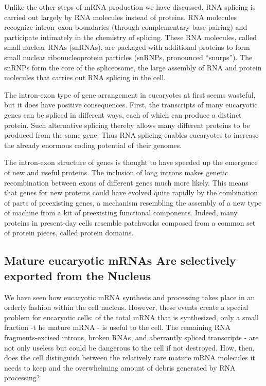 Unlike the other steps of mRNA production we have discussed, RNA
splicing is carried out largely by RNA molecules instead of proteins. RNA
molecules recognize intron–exon boundaries (through complementary
base-pairing) and participate intimately in the chemistry of splicing.
These RNA molecules, called small nuclear RNAs (snRNAs), are packaged
with additional proteins to form small nuclear ribonucleoprotein
particles (snRNPs, pronounced “snurps”). The snRNPs form the core of
the spliceosome, the large assembly of RNA and protein molecules that
carries out RNA splicing in the cell.

The intron-exon type of gene arrangement in eucaryotes at first seems
wasteful, but it does have positive consequences. First, the transcripts of
many eucaryotic genes can be spliced in different ways, each of which
can produce a distinct protein. Such alternative splicing thereby allows
many different proteins to be produced from the same gene.
Thus RNA splicing enables eucaryotes to increase the already enormous
coding potential of their genomes.

The intron-exon structure of genes is thought to have speeded up the emergence of new and
useful proteins. The inclusion of long introns makes genetic recombination
between exons of different genes much more likely. This means that
genes for new proteins could have evolved quite rapidly by the combination
of parts of preexisting genes, a mechanism resembling the assembly
of a new type of machine from a kit of preexisting functional components.
Indeed, many proteins in present-day cells resemble patchworks
composed from a common set of protein pieces, called protein domains.

\subsection{Mature eucaryotic mRNAs Are selectively exported from the Nucleus}

We have seen how eucaryotic mRNA synthesis and processing takes
place in an orderly fashion within the cell nucleus. However, these events
create a special problem for eucaryotic cells: of the total mRNA that is
synthesized, only a small fraction -t he mature mRNA - is useful to the
cell. The remaining RNA fragments-excised introns, broken RNAs, and
aberrantly spliced transcripts - are not only useless but could be dangerous
to the cell if not destroyed. How, then, does the cell distinguish
between the relatively rare mature mRNA molecules it needs to keep and
the overwhelming amount of debris generated by RNA processing?

